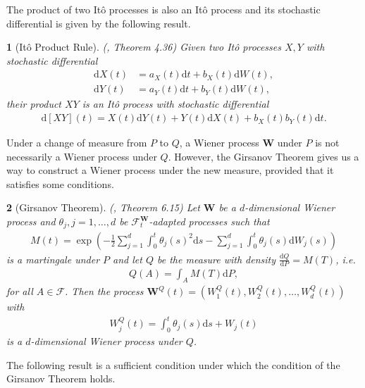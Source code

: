 \documentclass[english]{article}
\numberwithin{equation}{section}
\numberwithin{figure}{section}
\theoremstyle{bolddescit}
\newtheorem{theorem}{\protect\theoremname}[section]
\theoremstyle{definition}
\theoremstyle{definition}
\theoremstyle{plain}
\theoremstyle{plain}
\theoremstyle{bolddesc}
\theoremstyle{plain}
\theoremstyle{remark}
\providecommand{\theoremname}{Theorem}
\begin{document}
The product of two It\^o processes is also an It\^o process and its stochastic differential is given by the following result.

\begin{theorem}[It\^o Product Rule]\label{thm:ito-product-rule}
  (\cite{capinski_stochastic_2012}, Theorem 4.36)
  Given two It\^o processes $X, Y$ with stochastic differential
  \begin{align*}
    \mathrm{d}X(t) &= a_X(t) \mathrm{d}t + b_X(t) \mathrm{d}W(t),\\
    \mathrm{d}Y(t) &= a_Y(t) \mathrm{d}t + b_Y(t) \mathrm{d}W(t),
  \end{align*}
  their product $XY$ is an It\^o process with stochastic differential
  \begin{align*}
    \mathrm{d}[XY](t) = X(t) \mathrm{d}Y(t) + Y(t) \mathrm{d}X(t) + b_X(t) b_Y(t) \mathrm{d}t.
  \end{align*}
\end{theorem}

Under a change of measure from $P$ to $Q$, a Wiener process $\mathbf{W}$ under $P$ is not necessarily a Wiener process under $Q$. However, the Girsanov Theorem gives us a way to construct a Wiener process under the new measure, provided that it satisfies some conditions.

\begin{theorem}[Girsanov Theorem]\label{thm:girsanov}
  (\cite{capinski_blackscholes_2012}, Theorem 6.15)
  Let $\mathbf{W}$ be a $d$-dimensional Wiener process and $\theta_j, j=1,\ldots,d$ be $\mathcal{F}^\mathbf{W}_t$-adapted processes such that
  \begin{align*}
    M(t) = \exp \left( - \frac{1}{2} \sum_{j=1}^d \int_0^t \theta_j(s)^2 \mathrm{d}s - \sum_{j=1}^d \int_0^t \theta_j(s) \mathrm{d}W_j(s) \right)
  \end{align*}
  is a martingale under $P$ and let $Q$ be the measure with density $\frac{\mathrm{d}Q}{\mathrm{d}P} = M(T)$, i.e.
  \begin{align*}
    Q(A) = \int_A M(T) \mathrm{d}P,
  \end{align*}
  for all $A \in \mathcal{F}$.
  Then the process $\mathbf{W}^Q(t) = (W^Q_1(t), W^Q_2(t), \ldots, W^Q_d(t))$ with
  \begin{align*}
    W^Q_j(t) = \int_0^t \theta_j(s) \mathrm{d}s + W_j(t)
  \end{align*}
  is a $d$-dimensional Wiener process under $Q$.
\end{theorem}

The following result is a sufficient condition under which the condition of the Girsanov Theorem holds.
\end{document}
